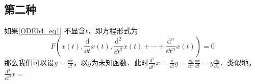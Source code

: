 \subsection{第二种}

如果\autoref{ODEb4_eq1} 不显含$t$，即方程形式为
\begin{equation}
F(x(t), \frac{\mathrm{d}}{\dd t}x(t), \frac{\mathrm{d}^2}{\dd t^2}x(t)+\cdots+\frac{\mathrm{d}^n}{\dd t^n}x(t))=0
\end{equation}
那么我们可以设$y=\frac{\dd x}{\dd t}$，以$y$为未知函数．此时$\frac{\mathrm{d}^2}{\dd t^2}x=\frac{\dd}{\dd t}y=\frac{\dd y}{\dd x}\frac{\dd x}{\dd t}=y\frac{\dd y}{\dd x}$．类似地，$\frac{\mathrm{d}^3}{\dd t^3}x=$
















